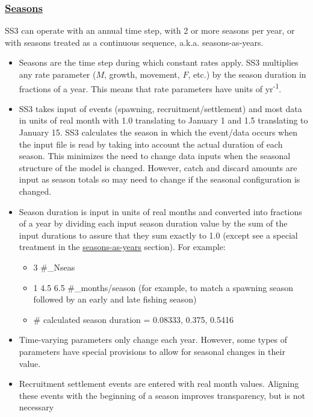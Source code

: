 \subsubsection[Seasons]{\protect\hyperlink{Seasons}{Seasons}}
SS3 can operate with an annual time step, with 2 or more seasons per year, or with seasons treated as a continuous sequence, a.k.a. seasons-as-years.
	 \begin{itemize}
	 	\item Seasons are the time step during which constant rates apply. SS3 multiplies any rate parameter ($M$, growth, movement, $F$, etc.) by the season duration in fractions of a year. This means that rate parameters have units of yr\textsuperscript{-1}.
	 	\item SS3 takes input of events (spawning, recruitment/settlement) and most data in units of real month with 1.0 translating to January 1 and 1.5 translating to January 15. SS3 calculates the season in which the event/data occurs when the input file is read by taking into account the actual duration of each season. This minimizes the need to change data inputs when the seasonal structure of the model is changed. However, catch and discard amounts are input as season totals so may need to change if the seasonal configuration is changed.
	 	\item Season duration is input in units of real months and converted into fractions of a year by dividing each input season duration value by the sum of the input durations to assure that they sum exactly to 1.0 (except see a special treatment in the \hyperlink{continuous-seasonal-recruitment-sec}{seasons-as-years} section). For example:
		\begin{itemize}
			\item 3 \#\_Nseas
			\item 1 4.5 6.5 \#\_months/season (for example, to match a spawning season followed by an early and late fishing season)
			\item \# calculated season duration = 0.08333, 0.375, 0.5416
		\end{itemize}
	 	\item Time-varying parameters only change each year. However, some types of parameters have special provisions to allow for seasonal changes in their value. 
	 	\item Recruitment settlement events are entered with real month values. Aligning these events with the beginning of a season improves transparency, but is not necessary 
	 \end{itemize}

